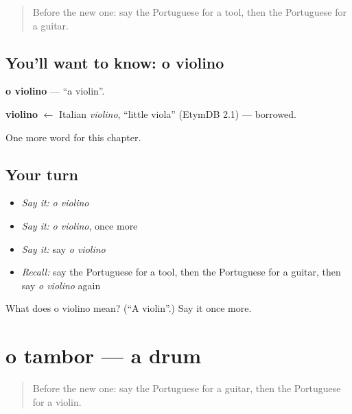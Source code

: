\label{lesson:PT-C196-violino}



\begin{quote}
Before the new one: say the Portuguese for a tool, then the Portuguese for a guitar.
\end{quote}

\subsection*{You'll want to know: o violino}
\textbf{o violino} — \textquotedblleft{}a violin\textquotedblright{}.

\begin{cousinweb}
\textbf{violino} $\leftarrow$ Italian \emph{violino}, \textquotedblleft{}little viola\textquotedblright{} (EtymDB 2.1) — borrowed.
\end{cousinweb}

\begin{grammarlens}[title={What you've built}]
One more word for this chapter.
\end{grammarlens}

\subsection*{Your turn}
\begin{itemize}
\raggedright
  \item \emph{Say it:} \emph{o violino}
  \item \emph{Say it:} \emph{o violino}, once more
  \item \emph{Say it:} say \emph{o violino}
  \item \emph{Recall:} say the Portuguese for a tool, then the Portuguese for a guitar, then say \emph{o violino} again
\end{itemize}

\begin{tcolorbox}[breakable,colback=teal!4,colframe=teal!35!black,title={Before you move on}]
What does o violino mean? (\textquotedblleft{}A violin\textquotedblright{}.) Say it once more.
\end{tcolorbox}
\section[o tambor]{o tambor — a drum}

\label{lesson:PT-C196-tambor}



\begin{quote}
Before the new one: say the Portuguese for a guitar, then the Portuguese for a violin.
\end{quote}

